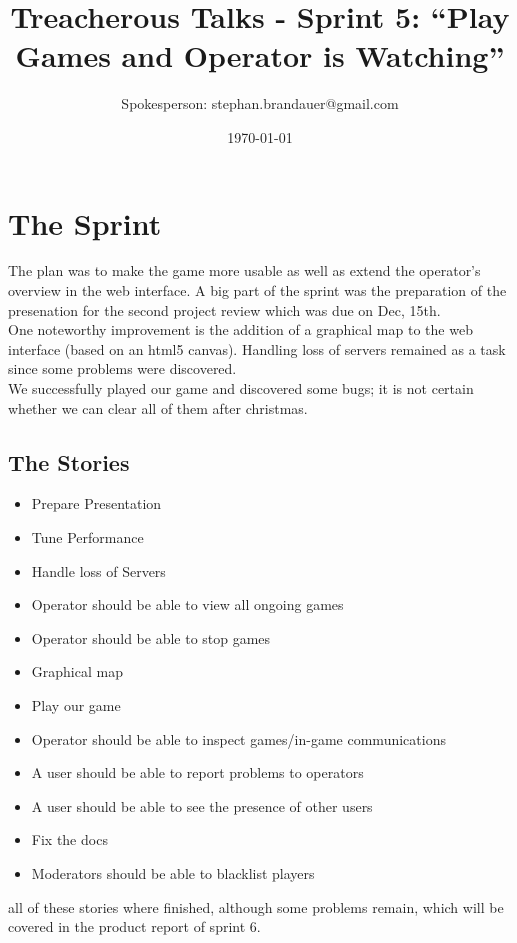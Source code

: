 \documentclass[11pt,a4paper]{article}
\begin{document}
\title{Treacherous Talks -
  Sprint 5: ``Play Games and Operator is Watching''}
\date{\today}
\author{Spokesperson: stephan.brandauer@gmail.com}
\maketitle

\section{The Sprint}

The plan was to make the game more usable as well as extend the operator's overview in the web interface.
A big part of the sprint was the preparation of the presenation for the second project review which was
due on Dec, 15th. \\
One noteworthy improvement is the addition of a graphical map to the web interface (based on an html5
canvas). Handling loss of servers remained as a task since some problems were discovered. \\
We successfully played our game and discovered some bugs; it is not certain whether we can clear all
of them after christmas.


\newpage

\subsection{The Stories}
\begin{itemize}
\item Prepare Presentation
\item Tune Performance
\item Handle loss of Servers
\item Operator should be able to view all ongoing games
\item Operator should be able to stop games
\item Graphical map
\item Play our game
\item Operator should be able to inspect games/in-game communications
\item A user should be able to report problems to operators
\item A user should be able to see the presence of other users
\item Fix the docs
\item Moderators should be able to blacklist players
\end{itemize}

all of these stories where finished, although some problems remain, which will be covered in the product
report of sprint 6.
\end{document}
